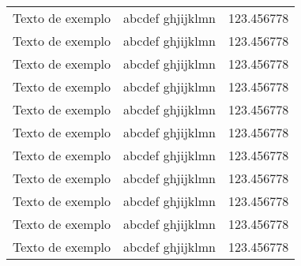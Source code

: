 \begin{longtable}{l|r|c}
  Texto de exemplo & abcdef ghjijklmn & 123.456778 \\
  Texto de exemplo & abcdef ghjijklmn & 123.456778 \\
  Texto de exemplo & abcdef ghjijklmn & 123.456778 \\
  Texto de exemplo & abcdef ghjijklmn & 123.456778 \\
  Texto de exemplo & abcdef ghjijklmn & 123.456778 \\
  Texto de exemplo & abcdef ghjijklmn & 123.456778 \\
  Texto de exemplo & abcdef ghjijklmn & 123.456778 \\
  Texto de exemplo & abcdef ghjijklmn & 123.456778 \\
  Texto de exemplo & abcdef ghjijklmn & 123.456778 \\
  Texto de exemplo & abcdef ghjijklmn & 123.456778 \\
  Texto de exemplo & abcdef ghjijklmn & 123.456778 \\

\end{longtable}
